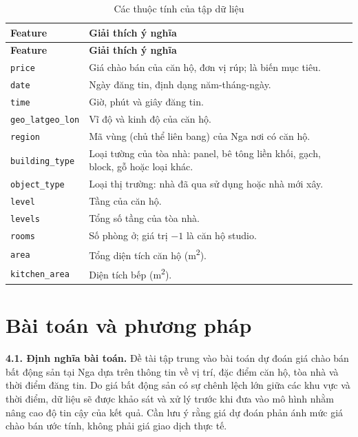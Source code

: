 \documentclass[12pt,a4paper]{article}
\newcommand{\hd}[1]{\textbf{#1}}
\newcommand{\ft}[1]{\texttt{\footnotesize #1}}
\begin{document}
\begingroup\small
\begin{longtable}{|>{\raggedright\arraybackslash}p{4.3cm}|>{\raggedright\arraybackslash}p{11.2cm}|}
\caption{Các thuộc tính của tập dữ liệu}\\
\hline
\rowcolor{gray!20} \hd{Feature} & \hd{Giải thích ý nghĩa} \\ \hline
\endfirsthead
\hline
\rowcolor{gray!20} \hd{Feature} & \hd{Giải thích ý nghĩa} \\ \hline
\endhead
\ft{price} & Giá chào bán của căn hộ, đơn vị rúp; là biến mục tiêu. \\ \hline
\ft{date} & Ngày đăng tin, định dạng năm-tháng-ngày. \\ \hline
\ft{time} & Giờ, phút và giây đăng tin. \\ \hline
\ft{geo\_lat}\newline\ft{geo\_lon} & Vĩ độ và kinh độ của căn hộ. \\ \hline
\ft{region} & Mã vùng (chủ thể liên bang) của Nga nơi có căn hộ. \\ \hline
\ft{building\_type} & Loại tường của tòa nhà: panel, bê tông liền khối, gạch, block, gỗ hoặc loại khác. \\ \hline
\ft{object\_type} & Loại thị trường: nhà đã qua sử dụng hoặc nhà mới xây. \\ \hline
\ft{level} & Tầng của căn hộ. \\ \hline
\ft{levels} & Tổng số tầng của tòa nhà. \\ \hline
\ft{rooms} & Số phòng ở; giá trị $-1$ là căn hộ studio. \\ \hline
\ft{area} & Tổng diện tích căn hộ (m\textsuperscript{2}). \\ \hline
\ft{kitchen\_area} & Diện tích bếp (m\textsuperscript{2}). \\ \hline
\end{longtable}
\endgroup

\section{Bài toán và phương pháp}
\textbf{4.1. Định nghĩa bài toán.} Đề tài tập trung vào bài toán dự đoán giá chào bán bất động sản tại Nga dựa trên thông tin về vị trí, đặc điểm căn hộ, tòa nhà và thời điểm đăng tin. Do giá bất động sản có sự chênh lệch lớn giữa các khu vực và thời điểm, dữ liệu sẽ được khảo sát và xử lý trước khi đưa vào mô hình nhằm nâng cao độ tin cậy của kết quả. Cần lưu ý rằng giá dự đoán phản ánh mức giá chào bán ước tính, không phải giá giao dịch thực tế.
\end{document}
